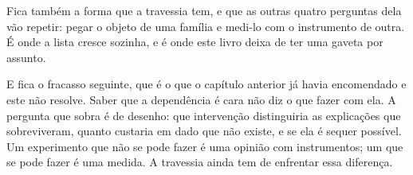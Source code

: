Fica também a forma que a travessia tem, e que as outras quatro perguntas dela vão repetir: pegar
o objeto de uma família e medi-lo com o instrumento de outra. É onde a lista cresce
sozinha, e é onde este livro deixa de ter uma gaveta por assunto.

E fica o fracasso seguinte, que é o que o capítulo anterior já havia encomendado e este não
resolve. Saber que a dependência é cara não diz o que fazer com ela. A pergunta que sobra é de
desenho: que intervenção distinguiria as explicações que sobreviveram, quanto custaria em dado que
não existe, e se ela é sequer possível. Um experimento que não se pode fazer é uma opinião com
instrumentos; um que se pode fazer é uma medida. A travessia ainda tem de enfrentar essa
diferença.
